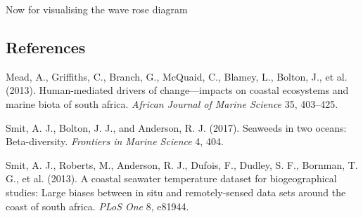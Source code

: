 \documentclass[10pt,a4,]{article}
\newenvironment{Shaded}{\begin{snugshade}}{\end{snugshade}}
\newcommand{\CommentTok}[1]{\textcolor[rgb]{0.56,0.35,0.01}{\textit{#1}}}
\newcommand{\DataTypeTok}[1]{\textcolor[rgb]{0.13,0.29,0.53}{#1}}
\newcommand{\DecValTok}[1]{\textcolor[rgb]{0.00,0.00,0.81}{#1}}
\newcommand{\KeywordTok}[1]{\textcolor[rgb]{0.13,0.29,0.53}{\textbf{#1}}}
\newcommand{\NormalTok}[1]{#1}
\newcommand{\OperatorTok}[1]{\textcolor[rgb]{0.81,0.36,0.00}{\textbf{#1}}}
\newcommand{\StringTok}[1]{\textcolor[rgb]{0.31,0.60,0.02}{#1}}
\begin{document}
Now for visualising the wave rose diagram

\begin{Shaded}
\end{Shaded}

\subsection*{References}

\hypertarget{refs}{}
\leavevmode\hypertarget{ref-Mead2013}{}%
Mead, A., Griffiths, C., Branch, G., McQuaid, C., Blamey, L., Bolton,
J., et al. (2013). Human-mediated drivers of change---impacts on coastal
ecosystems and marine biota of south africa. \emph{African Journal of
Marine Science} 35, 403--425.

\leavevmode\hypertarget{ref-Smit2017}{}%
Smit, A. J., Bolton, J. J., and Anderson, R. J. (2017). Seaweeds in two
oceans: Beta-diversity. \emph{Frontiers in Marine Science} 4, 404.

\leavevmode\hypertarget{ref-Smit2013}{}%
Smit, A. J., Roberts, M., Anderson, R. J., Dufois, F., Dudley, S. F.,
Bornman, T. G., et al. (2013). A coastal seawater temperature dataset
for biogeographical studies: Large biases between in situ and
remotely-sensed data sets around the coast of south africa. \emph{PLoS
One} 8, e81944.
\end{document}
